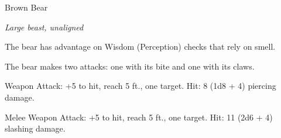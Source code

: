 \begin{monsterbox}{Brown Bear}
\begin{hangingpar}
\textit{Large beast, unaligned}
\end{hangingpar}
\dndline%
\basics[%
armorclass = 11,
hitpoints = 4d10 + 12,
speed = {40 ft., climb 30 ft.}
]
\dndline%
\stats[%
STR = \stat{19},
DEX = \stat{10},
CON = \stat{16},
INT = \stat{2},
WIS = \stat{13},
CHA = \stat{7}
]
\dndline%
\details[%
skills={Perception +3, },
damageimmunities={},
savingthrows={},
conditionimmunities={},
damageresistances={},
damagevulnerabilities={},
senses={passive Perception 13},
challenge=1
]
\dndline%
\begin{monsteraction}
The bear has advantage on Wisdom (Perception) checks that rely on smell.
\end{monsteraction}
\begin{monsteraction}[Multiattack]
The bear makes two attacks: one with its bite and one with its claws.
\end{monsteraction}
\begin{monsteraction}[Bite]
Weapon Attack: +5 to hit, reach 5 ft., one target. Hit: 8 (1d8 + 4) piercing damage.
\end{monsteraction}
\begin{monsteraction}[Claws]
Melee Weapon Attack: +5 to hit, reach 5 ft., one target. Hit: 11 (2d6 + 4) slashing damage.
\end{monsteraction}
\end{monsterbox}